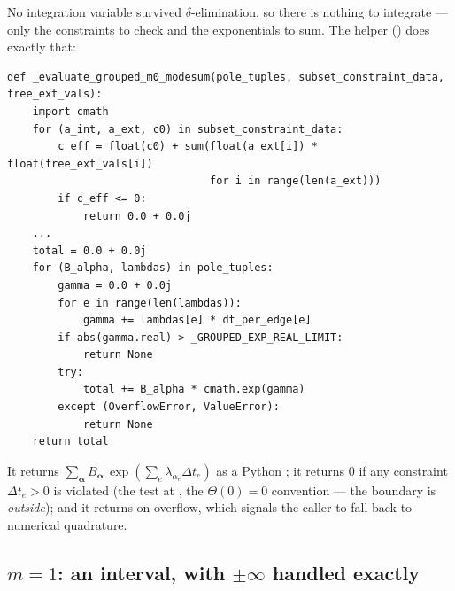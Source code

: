 No integration variable survived $\delta$-elimination, so there is nothing to
integrate --- only the constraints to check and the exponentials to sum. The
helper  ()
does exactly that:
\begin{lstlisting}
def _evaluate_grouped_m0_modesum(pole_tuples, subset_constraint_data, free_ext_vals):
    import cmath
    for (a_int, a_ext, c0) in subset_constraint_data:
        c_eff = float(c0) + sum(float(a_ext[i]) * float(free_ext_vals[i])
                                for i in range(len(a_ext)))
        if c_eff <= 0:
            return 0.0 + 0.0j
    ...
    total = 0.0 + 0.0j
    for (B_alpha, lambdas) in pole_tuples:
        gamma = 0.0 + 0.0j
        for e in range(len(lambdas)):
            gamma += lambdas[e] * dt_per_edge[e]
        if abs(gamma.real) > _GROUPED_EXP_REAL_LIMIT:
            return None
        try:
            total += B_alpha * cmath.exp(gamma)
        except (OverflowError, ValueError):
            return None
    return total
\end{lstlisting}
It returns $\sum_{\bm\alpha} B_{\bm\alpha}\,\exp(\sum_e \lambda_{\alpha_e}\Delta t_e)$
as a Python ; it returns $0$ if any constraint $\Delta t_e > 0$ is
violated (the test  at , the
$\Theta(0)=0$ convention --- the boundary is \emph{outside}); and it returns
 on overflow, which signals the caller to fall back to numerical
quadrature.

\subsection{$m=1$: an interval, with $\pm\infty$ handled exactly}

